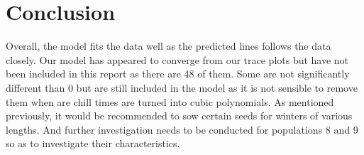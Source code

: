 \documentclass[mathserif]{article}
\begin{document}
\section*{Conclusion}
Overall, the model fits the data well as the predicted lines follows the 
data closely. Our model has appeared to converge from our trace plots
but have not been included in this report as there are 48 of them. Some
are not significantly different than 0 but are still included in the model
as it is not sensible to remove them when are chill times are turned
into cubic polynomials. As mentioned previously, it would be recommended
to sow certain seeds for winters of various lengths. And further investigation
needs to be conducted for populations 8 and 9 so as to investigate their
characteristics.
\end{document}
